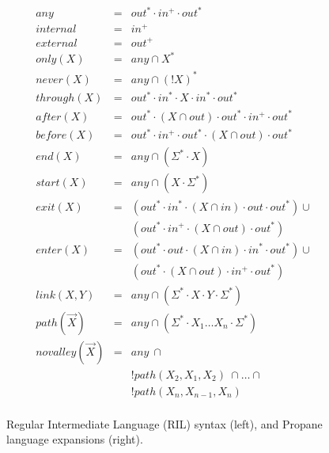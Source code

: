 \begin{figure}
\begin{minipage}[t]{.45\linewidth}
  \end{minipage}
  ~~
  \vrule
  ~~
  \begin{minipage}[t]{.5\linewidth}
  \vspace*{-1\baselineskip}
  \[ \begin{array}{rcl}
    \hline
    any           & = & out^* \cdot in^+ \cdot out^* \\
    internal      & = & in^+ \\
    external      & = & out^+ \\
    only(X)       & = & any \cap X^* \\
    never(X)      & = & any \cap (!X)^* \\
    through(X)    & = & out^* \cdot in^* \cdot X \cdot in^* \cdot out^* \\
    after(X)      & = & out^* \cdot (X \cap out) \cdot out^* \cdot in^+ \cdot out^* \\
    before(X)     & = & out^* \cdot in^+ \cdot out^* \cdot (X \cap out) \cdot out^* \\
    end(X)        & = & any \cap (\Sigma^* \cdot X) \\
    start(X)      & = & any \cap (X \cdot \Sigma^*) \\
    exit(X)       & = & (out^* \cdot in^* \cdot (X \cap in) \cdot out \cdot out^*) \cup \\
                  &        & (out^* \cdot in^+ \cdot (X \cap out) \cdot out^*) \\
    enter(X)      & = & (out^* \cdot out \cdot (X \cap in) \cdot in^* \cdot out^*) \cup \\
                  &        & (out^* \cdot (X \cap out) \cdot in^+ \cdot out^*) \\
    link(X,Y)     & = & any \cap (\Sigma^* \cdot X \cdot Y \cdot \Sigma^*) \\
    path(\vec{X}) & = & any \cap (\Sigma^* \cdot X_1 \dots X_n \cdot \Sigma^*) \\
    novalley(\vec{X}) & = & any ~ \cap \\
                  &   & !path(X_2,X_1,X_2) ~ \cap \dots \cap \\
                  &   & !path(X_n,X_{n-1},X_n) \\
  \end{array} \]

  \end{minipage}

  \hrulefill

  \caption{Regular Intermediate Language (RIL) syntax (left), and
           Propane language expansions (right).}
  \label{fig:rir-syntax}
\end{figure}


